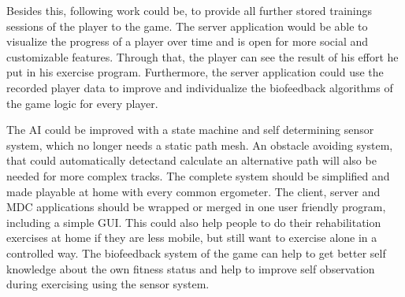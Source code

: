 \begin{multicols}{2}
Besides this, following work could be, to provide all further stored trainings sessions of the player to the game. The server application would be able to visualize the progress of a player over time and is open for more social and customizable features. Through that, the player can see the result of his effort he put in his exercise program. Furthermore, the server application could use the recorded player data to improve and individualize the biofeedback algorithms of the game logic for every player.

The AI could be improved with a state machine and self determining sensor system, which no
longer needs a static path mesh. An obstacle avoiding system, that could automatically detectand calculate an alternative path will also be needed for more complex tracks.
The complete system should be simplified and made playable at home with every common
ergometer. The client, server and MDC applications should be wrapped or merged in one user friendly program, including a simple GUI. This could also help people to do their rehabilitation exercises at home if they are less mobile, but still want to exercise alone in a controlled way. The biofeedback system of the game can help to get better self knowledge about the own fitness status and help to improve self observation during exercising using the sensor system.

\end{multicols}







